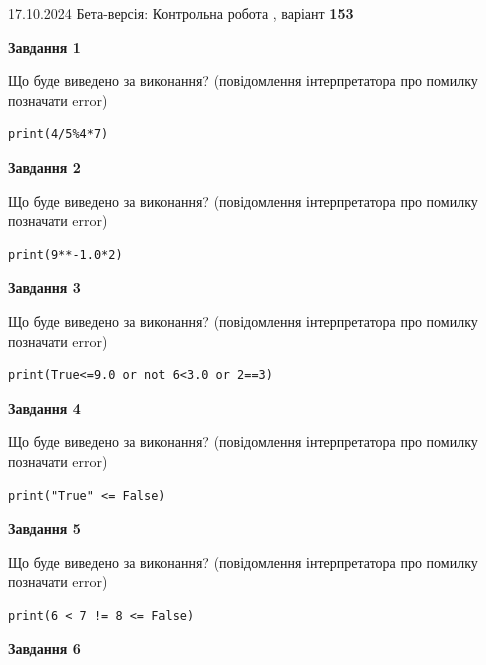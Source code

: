 \documentclass[12pt, ukrainian]{article}
\begin{document}
{\Large{17.10.2024 Бета-версія: Контрольна робота , варіант  \No \textbf { 153 }\par}}
{
\begin {large}
{\begin {center}\textbf{Завдання 1}\end {center}}

Що буде виведено за виконання? (повідомлення інтерпретатора про помилку позначати error)\par
\begin{verbatim}
print(4/5%4*7)
\end{verbatim}

{\begin {center}\textbf{Завдання 2}\end {center}}

Що буде виведено за виконання? (повідомлення інтерпретатора про помилку позначати error)\par
\begin{verbatim}
print(9**-1.0*2)
\end{verbatim}

{\begin {center}\textbf{Завдання 3}\end {center}}

Що буде виведено за виконання? (повідомлення інтерпретатора про помилку позначати error)\par
\begin{verbatim}
print(True<=9.0 or not 6<3.0 or 2==3)
\end{verbatim}

{\begin {center}\textbf{Завдання 4}\end {center}}

Що буде виведено за виконання? (повідомлення інтерпретатора про помилку позначати error)\par
\begin{verbatim}
print("True" <= False)
\end{verbatim}

{\begin {center}\textbf{Завдання 5}\end {center}}

Що буде виведено за виконання? (повідомлення інтерпретатора про помилку позначати error)\par
\begin{verbatim}
print(6 < 7 != 8 <= False)
\end{verbatim}

{\begin {center}\textbf{Завдання 6}\end {center}}


\end{large}}
\end{document}

